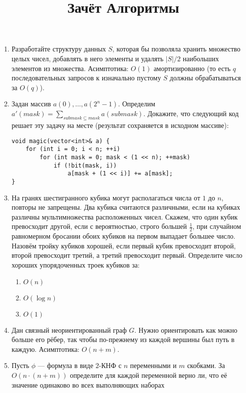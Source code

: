 \documentclass[a4paper, 12pt]{article}
\title{Зачёт Алгоритмы}
\begin{document}
\maketitle
    \begin{enumerate}
        \item Разработайте структуру данных $S$, которая бы позволяла хранить множество целых чисел,
        добавлять в него элементы и удалять $|S| / 2$ наибольших элементов из множества. Асимптотика: $O(1)$
        амортизированно (то есть $q$ последовательных запросов к изначально пустому $S$ должны обрабатываться за $O(q)$).
        \item  Задан массив $a(0),\dots,a(2^n-1)$. Определим $a'(mask)=\sum\limits_{submask\subseteq mask} a(submask)$. Докажите, что
        следующий код решает эту задачу на месте (результат сохраняется в исходном массиве):
        \begin{verbatim}
void magic(vector<int>& a) {
    for (int i = 0; i < n; ++i)
        for (int mask = 0; mask < (1 << n); ++mask)
            if (!bit(mask, i))
                a[mask + (1 << i)] += a[mask];
}
        \end{verbatim}
        \item  На гранях шестигранного кубика могут располагаться числа от $1$ до $n$, повторы не запрещены. Два
        кубика считаются различными, если на кубиках различны мультимножества расположенных чисел.
        Скажем, что один кубик превосходит другой, если с вероятностью, строго большей $\frac12$, при случайном
        равномерном бросании обоих кубиков на первом выпадает большее число. Назовём тройку кубиков
        хорошей, если первый кубик превосходит второй, второй превосходит третий, а третий превосходит
        первый. Определите число хороших упорядоченных троек кубиков за:
        \begin{enumerate}
            \item $O(n)$
            \item $O(\log n)$
            \item $O(1)$
        \end{enumerate}
        \item Дан связный неориентированный граф $G$. Нужно ориентировать как можно больше его
        рёбер, так чтобы по-прежнему из каждой вершины был путь в каждую. Асимптотика: $O(n + m)$.
        \item Пусть $\phi$ --- формула в виде $2$-КНФ с $n$ переменными и $m$ скобками. За $O(n \cdot (n + m))$
        определите для каждой переменной верно ли, что её значение одинаково во всех выполняющих наборах

\end{enumerate}
\end{document}
